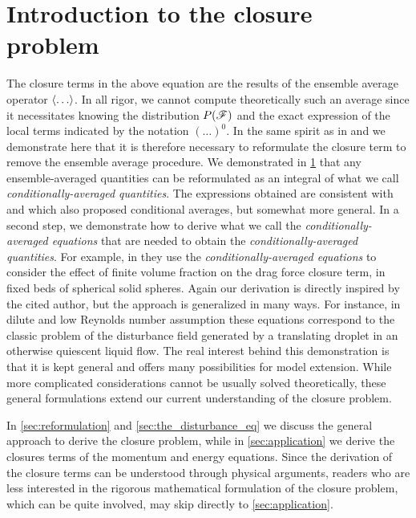 \section{Introduction to the closure problem}
\label{ap:Closure_problem}

The closure terms in the above equation are the results of the ensemble average operator $\left<\ldots\right>$. 
In all rigor, we cannot compute theoretically such an average since it necessitates knowing the distribution $P(\mathscr{F})$ and the exact expression of the local terms indicated by the notation $(\ldots)^0$. 
In the same spirit as in \citet{batchelor1972sedimentation,hinch1977averaged} and \citet{zhang1994averaged} we demonstrate here that it is therefore necessary to reformulate the closure term to remove the ensemble average procedure. 
We demonstrated in \ref{ap:Closure_problem} that any ensemble-averaged quantities can be reformulated as an integral of what we call \textit{conditionally-averaged quantities}. 
The expressions obtained are  consistent with \citet{batchelor1972sedimentation,hinch1977averaged} and \citet{zhang1994averaged} which also proposed conditional averages, but somewhat more general. 
In a second step, we demonstrate how to derive what we call the \textit{conditionally-averaged equations} that are needed to obtain the \textit{conditionally-averaged quantities}. 
For example, in \citet{kim1985modelling} they use the \textit{conditionally-averaged equations} to consider the effect of finite volume fraction on the drag force closure term, in fixed beds of spherical solid spheres. 
Again our derivation is directly inspired by the cited author, but the approach is generalized in many ways. 
For instance, in dilute and low Reynolds number assumption these equations correspond to the classic problem of the disturbance field generated by a translating droplet in an otherwise quiescent liquid flow. 
The real interest behind this demonstration is that it is kept general and offers many possibilities for model extension.
While more complicated considerations cannot be usually solved theoretically, these general formulations extend our current understanding of the closure problem. 


In \ref{sec:reformulation} and \ref{sec:the_disturbance_eq} we discuss the general approach to derive the closure problem, while in \ref{sec:application} we derive the closures terms of the momentum and energy equations. 
Since the derivation of the closure terms can be understood through physical arguments, readers who are less interested in the rigorous mathematical formulation of the closure problem, which can be quite involved, may skip directly to \ref{sec:application}.


